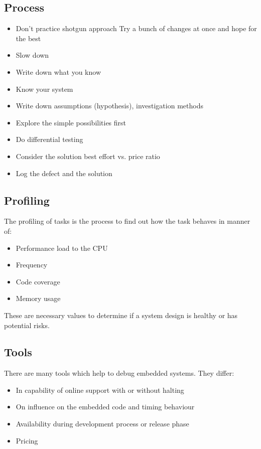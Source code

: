 \subsection{Process}
\begin{itemize}
    \item Don't practice shotgun approach \glqq Try a bunch of changes at once and hope for the best\grqq
    \item Slow down
    \item Write down what you know
    \item Know your system
    \item Write down assumptions (hypothesis), investigation methods
    \item Explore the simple possibilities first
    \item Do differential testing
    \item Consider the solution best effort vs. price ratio
    \item Log the defect and the solution
\end{itemize}


\subsection{Profiling}
The profiling of tasks is the process to find out how the task behaves in manner of:
\begin{itemize}
    \item Performance load to the CPU
    \item Frequency
    \item Code coverage
    \item Memory usage
\end{itemize}
These are necessary values to determine if a system design is healthy or has potential risks.

\subsection{Tools}
There are many tools which help to debug embedded systems.
They differ:
\begin{itemize}
    \item In capability of online support with or without halting
    \item On influence on the embedded code and timing behaviour
    \item Availability during development process or release phase
    \item Pricing
\end{itemize}

